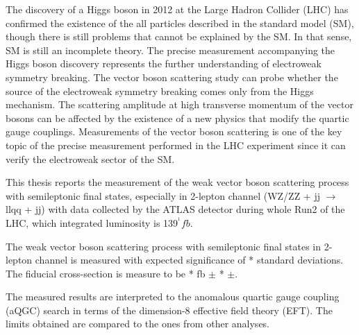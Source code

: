 
The discovery of a Higgs boson in 2012 at the Large Hadron Collider (LHC) has confirmed the existence of the all particles described in the standard model (SM), though there is still problems that cannot be explained by the SM. In that sense, SM is still an incomplete theory. The precise measurement accompanying the Higgs boson discovery represents the further understanding of electroweak symmetry breaking. The vector boson scattering study can probe whether the source of the electroweak symmetry breaking comes only from the Higgs mechanism. The scattering amplitude at high transverse momentum of the vector bosons can be affected by the existence of a new physics that modify the quartic gauge couplings.
Measurements of the vector boson scattering is one of the key topic of the precise measurement performed in the LHC experiment since it can verify the electroweak sector of the SM. 

This thesis reports the measurement of the weak vector boson scattering process with semileptonic final states, especially in 2-lepton channel (WZ/ZZ + jj $\rightarrow$ llqq + jj) with data collected by the ATLAS detector during whole Run2 of the LHC, which integrated luminosity is 139$^{^1}fb$.

The weak vector boson scattering process with semileptonic final states in 2-lepton channel is measured with expected significance of
* standard deviations. The fiducial cross-section is measure to be * fb $\pm$ * $\pm$.

The measured results are interpreted to the anomalous quartic gauge coupling (aQGC) search in terms of the dimension-8 effective field theory (EFT). The limits obtained are compared to the ones from other analyses.


